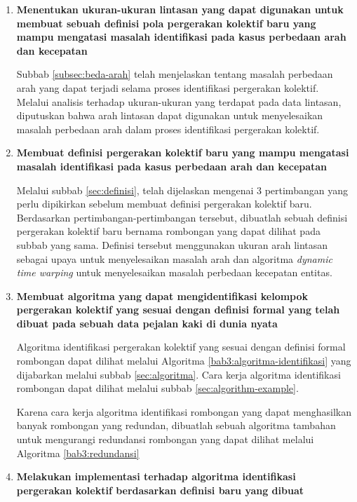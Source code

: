 \begin{enumerate}
    \item \textbf{Menentukan ukuran-ukuran lintasan yang dapat digunakan untuk membuat sebuah definisi pola pergerakan kolektif baru yang mampu mengatasi masalah identifikasi pada kasus perbedaan arah dan kecepatan}
    
    Subbab \ref{subsec:beda-arah} telah menjelaskan tentang masalah perbedaan arah yang dapat terjadi selama proses identifikasi pergerakan kolektif. Melalui analisis terhadap ukuran-ukuran yang terdapat pada data lintasan, diputuskan bahwa arah lintasan dapat digunakan untuk menyelesaikan masalah perbedaan arah dalam proses identifikasi pergerakan kolektif.
    
    \item \textbf{Membuat definisi pergerakan kolektif baru yang mampu mengatasi masalah identifikasi pada kasus perbedaan arah dan kecepatan}
    
    Melalui subbab \ref{sec:definisi}, telah dijelaskan mengenai 3 pertimbangan yang perlu dipikirkan sebelum membuat definisi pergerakan kolektif baru. Berdasarkan pertimbangan-pertimbangan tersebut, dibuatlah sebuah definisi pergerakan kolektif baru bernama rombongan yang dapat dilihat pada subbab yang sama. Definisi tersebut menggunakan ukuran arah lintasan sebagai upaya untuk menyelesaikan masalah arah dan algoritma \textit{dynamic time warping} untuk menyelesaikan masalah perbedaan kecepatan entitas.
    
    \item \textbf{Membuat algoritma yang dapat mengidentifikasi kelompok pergerakan kolektif yang sesuai dengan definisi formal yang telah dibuat pada sebuah data pejalan kaki di dunia nyata}
    
    Algoritma identifikasi pergerakan kolektif yang sesuai dengan definisi formal rombongan dapat dilihat melalui Algoritma \ref{bab3:algoritma-identifikasi} yang dijabarkan melalui subbab \ref{sec:algoritma}. Cara kerja algoritma identifikasi rombongan dapat dilihat melalui subbab \ref{sec:algorithm-example}.
    
    Karena cara kerja algoritma identifikasi rombongan yang dapat menghasilkan banyak rombongan yang redundan, dibuatlah sebuah algoritma tambahan untuk mengurangi redundansi rombongan yang dapat dilihat melalui Algoritma \ref{bab3:redundansi}
    
    \item \textbf{Melakukan implementasi terhadap algoritma identifikasi pergerakan kolektif berdasarkan definisi baru yang dibuat}
    

\end{enumerate}
